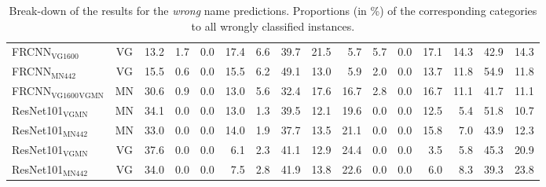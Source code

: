 \begin{table}[t]
\begin{tabular}{l|c|r@{~}|r@{~}r@{~}r@{~}r@{~}|r@{~}r@{~}||r@{~}|r@{~}r@{~}r@{~}r@{~}|r@{~}r@{~}}
		\midrule
		FRCNN$_{\text{VG1600}}$ & VG     &                 13.2 &             1.7 &                 0.0 &                  17.4 &            6.6 &           39.7 &             21.5 &                  5.7 &             5.7 &                 0.0 &                  17.1 &           14.3 &           42.9 &             14.3 \\
		FRCNN$_{\text{MN442}}$ & VG       &                 15.5 &             0.6 &                 0.0 &                  15.5 &            6.2 &           49.1 &             13.0 &                  5.9 &             2.0 &                 0.0 &                  13.7 &           11.8 &           54.9 &             11.8 \\
		\midrule \midrule
		FRCNN$_{\text{VG1600}}$$_{\text{VGMN}}$ & MN &                 30.6 &             0.9 &                 0.0 &                  13.0 &            5.6 &           32.4 &             17.6 &                 16.7 &             2.8 &                 0.0 &                  16.7 &           11.1 &           41.7 &             11.1 \\
		\midrule
		ResNet101$_{\text{VGMN}}$ & MN	&                 34.1 &             0.0 &                 0.0 &                  13.0 &            1.3 &           39.5 &             12.1 &                 19.6 &             0.0 &                 0.0 &                  12.5 &            5.4 &           51.8 &             10.7 \\
		ResNet101$_{\text{MN442}}$ & MN  &                 33.0 &             0.0 &                 0.0 &                  14.0 &            1.9 &           37.7 &             13.5 &                 21.1 &             0.0 &                 0.0 &                  15.8 &            7.0 &           43.9 &             12.3 \\
		ResNet101$_{\text{VGMN}}$ & VG  &                 37.6 &             0.0 &                 0.0 &                   6.1 &            2.3 &           41.1 &             12.9 &                 24.4 &             0.0 &                 0.0 &                   3.5 &            5.8 &           45.3 &             20.9 \\
		ResNet101$_{\text{MN442}}$ & VG &                 34.0 &             0.0 &                 0.0 &                   7.5 &            2.8 &           41.9 &             13.8 &                 22.6 &             0.0 &                 0.0 &                   6.0 &            8.3 &           39.3 &             23.8 \\
		\bottomrule
	\end{tabular}
	\caption{Break-down of the results for the \textit{wrong} name predictions. Proportions (in \%) of the corresponding categories to all wrongly classified instances.  \label{tab:exp_details_wrong}}
\end{table}

